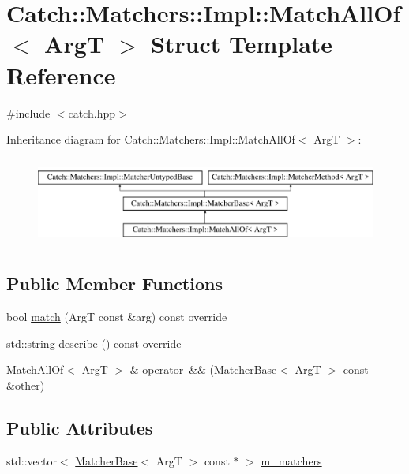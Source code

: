 \hypertarget{struct_catch_1_1_matchers_1_1_impl_1_1_match_all_of}{}\section{Catch\+::Matchers\+::Impl\+::Match\+All\+Of$<$ ArgT $>$ Struct Template Reference}
\label{struct_catch_1_1_matchers_1_1_impl_1_1_match_all_of}


{\ttfamily \#include $<$catch.\+hpp$>$}

Inheritance diagram for Catch\+::Matchers\+::Impl\+::Match\+All\+Of$<$ ArgT $>$\+:\begin{figure}[H]
\begin{center}
\leavevmode
\includegraphics[height=2.926829cm]{struct_catch_1_1_matchers_1_1_impl_1_1_match_all_of}
\end{center}
\end{figure}
\subsection*{Public Member Functions}
\begin{DoxyCompactItemize}
\item 
bool \mbox{\hyperlink{struct_catch_1_1_matchers_1_1_impl_1_1_match_all_of_acfb377bda2c58ae62e6df9c3a8a89f8f}{match}} (ArgT const \&arg) const override
\item 
std\+::string \mbox{\hyperlink{struct_catch_1_1_matchers_1_1_impl_1_1_match_all_of_acbb9a083e93b546fd33c9235b644c40f}{describe}} () const override
\item 
\mbox{\hyperlink{struct_catch_1_1_matchers_1_1_impl_1_1_match_all_of}{Match\+All\+Of}}$<$ ArgT $>$ \& \mbox{\hyperlink{struct_catch_1_1_matchers_1_1_impl_1_1_match_all_of_a60abff7d95c81453413179bc5db51f88}{operator \&\&}} (\mbox{\hyperlink{struct_catch_1_1_matchers_1_1_impl_1_1_matcher_base}{Matcher\+Base}}$<$ ArgT $>$ const \&other)
\end{DoxyCompactItemize}
\subsection*{Public Attributes}
\begin{DoxyCompactItemize}
\item 
std\+::vector$<$ \mbox{\hyperlink{struct_catch_1_1_matchers_1_1_impl_1_1_matcher_base}{Matcher\+Base}}$<$ ArgT $>$ const  $\ast$ $>$ \mbox{\hyperlink{struct_catch_1_1_matchers_1_1_impl_1_1_match_all_of_a98d6a2611f195a4a5c49f92fd877be9a}{m\+\_\+matchers}}
\end{DoxyCompactItemize}
